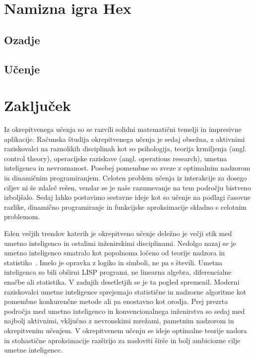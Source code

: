 \documentclass[a4paper, oneside, 12pt]{report}
\begin{document}

\newpage

\chapter{Namizna igra Hex}
\thispagestyle{fancy}
\section{Ozadje}
\section{Učenje}
\newpage

\chapter{Zaključek}
\thispagestyle{fancy}
Iz okrepitvenega učenja so se razvili solidni matematični temelji in impresivne aplikacije. Računska študija okrepitvenega učenja je sedaj obsežna, z aktivnimi raziskovalci na raznolikih disciplinah kot so psihologija, teorija krmiljenja (angl. control theory), operacijske raziskave (angl. operations research), umetna inteligenca in nevroznanost. Posebej pomembne so zveze z optimalnim nadzorom in dinamičnim programiranjem. Celoten problem učenja iz interakcije za dosego ciljev ni še zdaleč rešen, vendar se je naše razumevanje na tem področju bistveno izboljšalo. Sedaj lahko postavimo sestavne ideje kot so učenje na podlagi časovne razlike, dinamično programiranje in funkcijske aproksimacije skladno s celotnim problemom.

Eden večjih trendov katerih je okrepitveno učenje deležno je večji stik med umetno inteligenco in ostalimi inženirskimi disciplinami. Nedolgo nazaj se je umetno inteligenco smatralo kot popolnoma ločeno od teorije nadzora in statistiko~\cite{ReinforcementLearningAnIntroduction}. Imelo je opravka z logiko in simboli, ne pa s števili. Umetna inteligenca so bili obširni LISP programi, ne linearna algebra, diferencialne enačbe ali statistika. V zadnjih desetletjih se je ta pogled spremenil. Moderni raziskovalci umetne inteligence sprejemajo statistične in nadzorne algoritme kot pomembne konkurenčne metode ali pa enostavno kot orodja. Prej prezrta področja med umetno inteligenco in konvencionalnega inženirstva so sedaj med najbolj aktivnimi, vključno z nevronskimi mrežami, pametnim nadzorom in okrepitvenim učenjem. V okrepitvenem učenju se ideje optimalne teorije nadora in stohastične aproksimacije razširijo za nasloviti širše in bolj ambiciozne cilje umetne inteligence.
\end{document}
